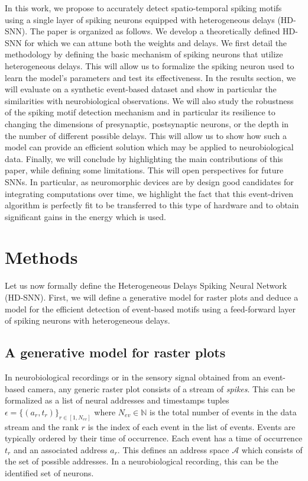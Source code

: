 \documentclass[runningheads]{llncs}
\newcommand{\presynaddr}{a} %
\newcommand{\numevent}{N_{ev}} %
\newcommand{\presynaddrspace}{\mathcal{A}} %
\newcommand{\arank}{r} %
\newcommand{\timev}{t} %
\newcommand{\event}{\epsilon} %
\begin{document}
In this work, we propose to accurately detect spatio-temporal spiking motifs using a single layer of spiking neurons equipped with heterogeneous delays (HD-SNN). The paper is organized as follows. We develop a theoretically defined HD-SNN for which we can attune both the weights and delays. We first detail the methodology by defining the basic mechanism of spiking neurons that utilize heterogeneous delays. This will allow us to formalize the spiking neuron used to learn the model's parameters and test its effectiveness. In the results section, we will evaluate on a synthetic event-based dataset and show in particular the similarities with neurobiological observations. We will also study the robustness of the spiking motif detection mechanism and in particular its resilience to changing the dimensions of presynaptic, postsynaptic neurons, or the depth in the number of different possible delays. This will allow us to show how such a model can provide an efficient solution which may be applied to neurobiological data.  Finally, we will conclude by highlighting the main contributions of this paper, while defining some limitations. This will open perspectives for future SNNs.  In particular, as neuromorphic devices are by design good candidates for integrating computations over time, we highlight the fact that this event-driven algorithm is perfectly fit to be transferred to this type of hardware and to obtain significant gains in the energy which is used.
%
\section{Methods}
\label{sec:methods}
Let us now formally define the Heterogeneous Delays Spiking Neural Network (HD-SNN). First, we will define a generative model for raster plots and deduce a model for the efficient detection of event-based motifs using a feed-forward layer of spiking neurons with heterogeneous delays.
%
\subsection{A generative model for raster plots}
%
In neurobiological recordings or in the sensory signal obtained from an event-based camera, any generic raster plot consists of a stream of \emph{spikes}. This can be formalized as a list of neural addresses and timestamps tuples $\event = \{(\presynaddr_\arank, \timev_\arank)\}_{\arank \in [1,\numevent]}$ where $\numevent \in \mathbb{N}$ is the total number of events in the data stream and the rank $\arank$ is the index of each event in the list of events. Events are typically ordered by their time of occurrence. Each event has a time of occurrence $\timev_\arank$  and an associated address $\presynaddr_\arank$. This defines an address space $\presynaddrspace$ which consists of the set of possible addresses. In a neurobiological recording, this can be the identified set of neurons.
\end{document}
